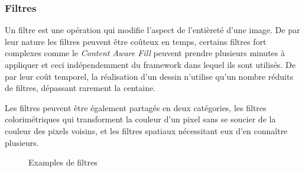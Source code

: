 			\subsubsection{Filtres}
				Un filtre est une opération qui modifie l'aspect de l'entièreté d'une image. De par leur nature
				les filtres peuvent être coûteux en temps, certains filtres fort complexes comme le \emph{Content Aware Fill}
				peuvent prendre plusieurs minutes à appliquer et ceci indépendemment du framework dans lequel ils
				sont utilisés. De par leur coût temporel, la réalisation d'un dessin n'utilise qu'un nombre réduits
				de filtres, dépassant rarement la centaine. 
				

				Les filtres peuvent être également partagés en deux catégories, les filtres colorimétriques qui transforment
				la couleur d'un pixel sans se soucier de la couleur des pixels voisins,  et les filtres spatiaux nécessitant 
				eux d'en connaître plusieurs. 
				\begin{figure}[h]
					\centering
					\caption{Examples de filtres}
					\label{fig:filtres}
				\end{figure}
